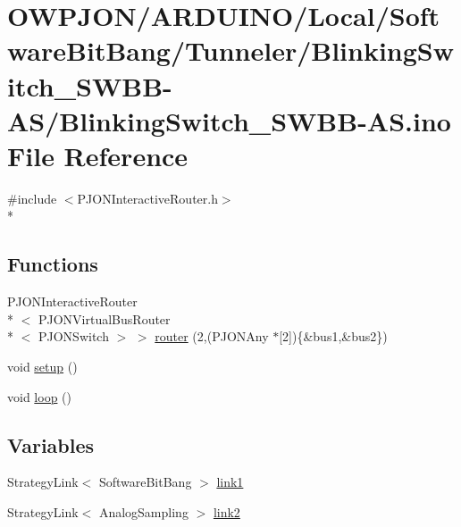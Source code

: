 \hypertarget{BlinkingSwitch__SWBB-AS_8ino}{\section{O\-W\-P\-J\-O\-N/\-A\-R\-D\-U\-I\-N\-O/\-Local/\-Software\-Bit\-Bang/\-Tunneler/\-Blinking\-Switch\-\_\-\-S\-W\-B\-B-\/\-A\-S/\-Blinking\-Switch\-\_\-\-S\-W\-B\-B-\/\-A\-S.ino File Reference}
\label{BlinkingSwitch__SWBB-AS_8ino}
}
{\ttfamily \#include $<$P\-J\-O\-N\-Interactive\-Router.\-h$>$}\\*
\subsection*{Functions}
\begin{DoxyCompactItemize}
\item 
P\-J\-O\-N\-Interactive\-Router\\*
$<$ P\-J\-O\-N\-Virtual\-Bus\-Router\\*
$<$ P\-J\-O\-N\-Switch $>$ $>$ \hyperlink{BlinkingSwitch__SWBB-AS_8ino_a8c8a35b003b9467f7f3b1a828c90a5b5}{router} (2,(P\-J\-O\-N\-Any $\ast$\mbox{[}2\mbox{]})\{\&bus1,\&bus2\})
\item 
void \hyperlink{BlinkingSwitch__SWBB-AS_8ino_a4fc01d736fe50cf5b977f755b675f11d}{setup} ()
\item 
void \hyperlink{BlinkingSwitch__SWBB-AS_8ino_afe461d27b9c48d5921c00d521181f12f}{loop} ()
\end{DoxyCompactItemize}
\subsection*{Variables}
\begin{DoxyCompactItemize}
\item 
Strategy\-Link$<$ Software\-Bit\-Bang $>$ \hyperlink{BlinkingSwitch__SWBB-AS_8ino_ae2f4f4a5ca9a8a627a5132d1868bf5c0}{link1}
\item 
Strategy\-Link$<$ Analog\-Sampling $>$ \hyperlink{BlinkingSwitch__SWBB-AS_8ino_a6ab0c6e3e6ae04f06e58b38531729623}{link2}
\end{DoxyCompactItemize}


